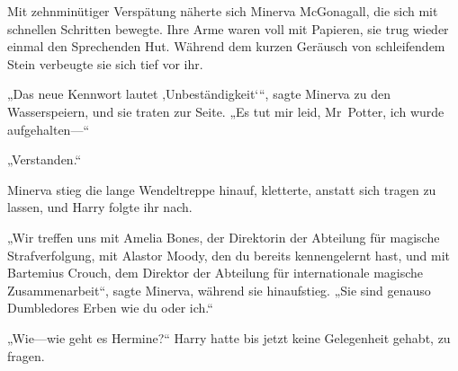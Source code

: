 Mit zehnminütiger Verspätung näherte sich Minerva McGonagall, die sich mit schnellen Schritten bewegte. Ihre Arme waren voll mit Papieren, sie trug wieder einmal den Sprechenden Hut. Während dem kurzen Geräusch von schleifendem Stein verbeugte sie sich tief vor ihr.

„Das neue Kennwort lautet ‚Unbeständigkeit‘“, sagte Minerva zu den Wasserspeiern, und sie traten zur Seite.
„Es tut mir leid, Mr~Potter, ich wurde aufgehalten—“

„Verstanden.“

Minerva stieg die lange Wendeltreppe hinauf, kletterte, anstatt sich tragen zu lassen, und Harry folgte ihr nach.

„Wir treffen uns mit Amelia Bones, der Direktorin der Abteilung für magische Strafverfolgung, mit Alastor Moody, den du bereits kennengelernt hast, und mit Bartemius Crouch, dem Direktor der Abteilung für internationale magische Zusammenarbeit“, sagte Minerva, während sie hinaufstieg.
„Sie sind genauso Dumbledores Erben wie du oder ich.“

„Wie—wie geht es Hermine?“
Harry hatte bis jetzt keine Gelegenheit gehabt, zu fragen.

